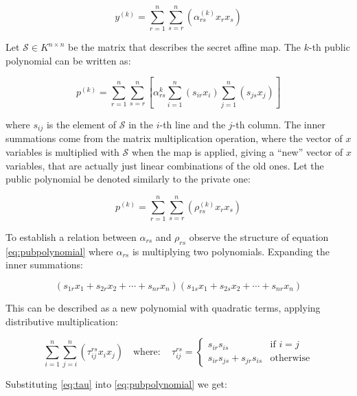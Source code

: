 \documentclass{ufsctex/ufsctex}
\begin{document}
\begin{equation}
y^{(k)} = \sum_{r=1}^n \sum_{s=r}^n\left(\alpha^{(k)}_{rs}x_rx_s\right)
\end{equation}

Let $\mathcal{S} \in K^{n \times n}$ be the matrix that describes the secret
affine map. The $k$-th public polynomial can be written as:

\begin{equation}\label{eq:pubpolynomial}
p^{(k)} = \sum_{r=1}^n \sum_{s=r}^n
\left[ \alpha^{k}_{rs} \sum_{i=1}^n(s_{ir}x_i) \sum_{j=1}^n(s_{js}x_j) \right]
\end{equation}

where $s_{ij}$ is the element of $\mathcal{S}$ in the $i$-th line and the
$j$-th column. The inner summations come from the matrix multiplication
operation, where the vector of $x$ variables is multiplied with $\mathcal{S}$
when the map is applied, giving a ``new'' vector of $x$ variables, that are
actually just linear combinations of the old ones. Let the public polynomial be
denoted similarly to the private one:

\begin{equation}
p^{(k)} = \sum_{r=1}^n \sum_{s=r}^n \left( \rho^{(k)}_{rs}x_rx_s \right)
\end{equation}

To establish a relation between $\alpha_{rs}$ and $\rho_{rs}$
observe the structure of equation \ref{eq:pubpolynomial} where $\alpha_{rs}$ is
multiplying two polynomials. Expanding the inner summations:

\begin{equation}
(s_{1r}x_1 + s_{2r}x_2 + \cdots + s_{nr}x_n)
(s_{1s}x_1 + s_{2s}x_2 + \cdots + s_{nr}x_n)
\end{equation}

This can be described as a new polynomial with quadratic terms, applying
distributive multiplication:

\begin{equation}\label{eq:tau}
\sum_{i=1}^{n}\sum_{j=i}^n \left( \tau^{rs}_{ij} x_i x_j \right)
\quad \mathrm{where:} \quad \tau^{rs}_{ij} =
\begin{cases}
	s_{ir} s_{is} &\mbox{if } i=j \\
	s_{ir} s_{js} + s_{jr} s_{is} &\mbox{otherwise}
\end{cases}
\end{equation}

Substituting \ref{eq:tau} into \ref{eq:pubpolynomial} we get:
\end{document}
